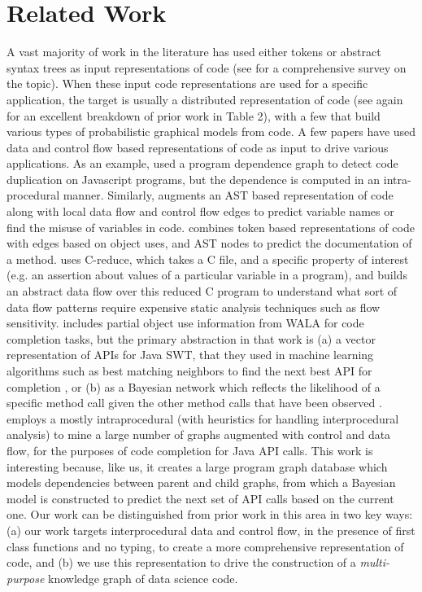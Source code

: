\section{Related Work}

A vast majority of work in the literature has used either tokens or abstract syntax trees as input representations of code (see \cite{Allamanis:2018:SML:3236632.3212695} for a comprehensive survey on the topic).  When these input code representations are used for a specific application, the target is usually a distributed representation of code (see again \cite{Allamanis:2018:SML:3236632.3212695} for an excellent breakdown of prior work in Table 2), with a few that build various types of probabilistic graphical models from code.  A few papers have used data and control flow based representations of code as input to drive various applications.  As an example, \cite{DBLP:conf/icpp/HsiaoCN14} used a program dependence graph to detect code duplication on Javascript programs, but the dependence is computed in an intra-procedural manner.  Similarly, \cite{DBLP:conf/iclr/AllamanisBK18} augments an AST based representation of code along with local data flow and control flow edges to predict variable names or find the misuse of variables in code.  \cite{DBLP:journals/corr/abs-1811-01824} combines token based representations of code with edges based on object uses, and AST nodes to predict the documentation of a method.  \cite{Chae:2017:AGF:3152284.3133925} uses C-reduce, which takes a C file, and a specific property of interest (e.g. an assertion about values of a particular variable in a program), and builds an abstract data flow over this reduced C program to understand what sort of data flow patterns require expensive static analysis techniques such as flow sensitivity. \cite{Bruch:2009:LEI:1595696.1595728, Proksch:2015:ICC:2852270.2744200} includes partial object use information from WALA for code completion tasks, but the primary abstraction in that work is (a) a vector representation of APIs for Java SWT, that they used in machine learning algorithms such as best matching neighbors to find the next best API for completion \cite{Bruch:2009:LEI:1595696.1595728}, or (b) as a Bayesian network which reflects the likelihood of a specific method call given the other method calls that have been observed \cite{Proksch:2015:ICC:2852270.2744200}. \cite{Nguyen:2015:GSL:2818754.2818858, Nguyen:2009:GMM:1595696.1595767} employs a mostly intraprocedural (with heuristics for handling interprocedural analysis) to mine a large number of graphs augmented with control and data flow, for the purposes of code completion for Java API calls.  This work is interesting because, like us, \cite{Nguyen:2015:GSL:2818754.2818858} it creates a large program graph database which models dependencies between parent and child graphs, from which a Bayesian model is constructed to predict the next set of API calls based on the current one.  Our work can be distinguished from prior work in this area in two key ways: (a) our work targets interprocedural data and control flow, in the presence of first class functions and no typing, to create a more comprehensive representation of code, and (b) we use this representation to drive the construction of a \textit{multi-purpose} knowledge graph of data science code.
